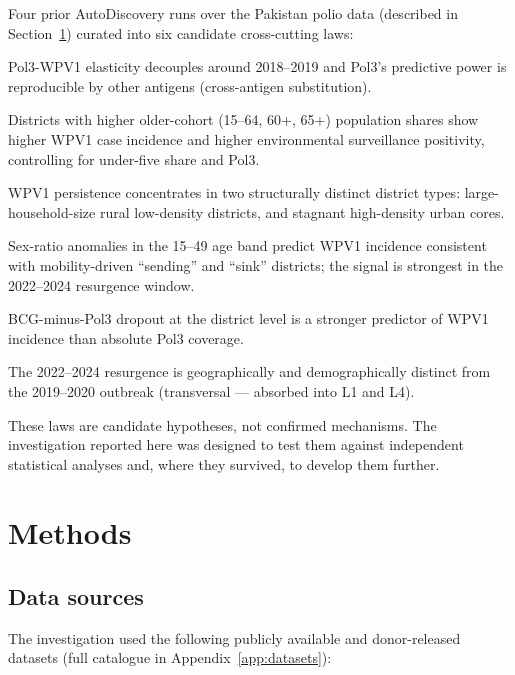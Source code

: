 \documentclass[11pt]{article}
\begin{document}
Four prior AutoDiscovery runs over the Pakistan polio data (described in Section~\ref{sec:methods}) curated into six candidate cross-cutting laws:
\begin{description}[itemsep=0.2em, labelindent=1em, leftmargin=1.5em]
\item[\textbf{L1}] Pol3-WPV1 elasticity decouples around 2018--2019 and Pol3's predictive power is reproducible by other antigens (cross-antigen substitution).
\item[\textbf{L2}] Districts with higher older-cohort (15--64, 60+, 65+) population shares show higher WPV1 case incidence and higher environmental surveillance positivity, controlling for under-five share and Pol3.
\item[\textbf{L3}] WPV1 persistence concentrates in two structurally distinct district types: large-household-size rural low-density districts, and stagnant high-density urban cores.
\item[\textbf{L4}] Sex-ratio anomalies in the 15--49 age band predict WPV1 incidence consistent with mobility-driven ``sending'' and ``sink'' districts; the signal is strongest in the 2022--2024 resurgence window.
\item[\textbf{L5}] BCG-minus-Pol3 dropout at the district level is a stronger predictor of WPV1 incidence than absolute Pol3 coverage.
\item[\textbf{L6}] The 2022--2024 resurgence is geographically and demographically distinct from the 2019--2020 outbreak (transversal --- absorbed into L1 and L4).
\end{description}

These laws are candidate hypotheses, not confirmed mechanisms. The investigation reported here was designed to test them against independent statistical analyses and, where they survived, to develop them further.

\section{Methods}
\label{sec:methods}

\subsection{Data sources}

The investigation used the following publicly available and donor-released datasets (full catalogue in Appendix~\ref{app:datasets}):
\end{document}
